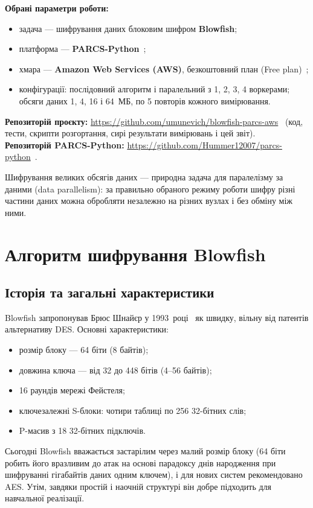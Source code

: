 \documentclass[a4paper,12pt]{article}
\begin{document}
\textbf{Обрані параметри роботи:}
\begin{itemize}
  \item задача --- шифрування даних блоковим шифром \textbf{Blowfish};
  \item платформа --- \textbf{PARCS-Python}~\cite{hummer-parcs};
  \item хмара --- \textbf{Amazon Web Services (AWS)}, безкоштовний план (Free plan)~\cite{aws-free-plan};
  \item конфігурації: послідовний алгоритм і паралельний з 1, 2, 3, 4 воркерами;
        обсяги даних 1, 4, 16 і 64~МБ, по 5 повторів кожного вимірювання.
\end{itemize}

\noindent\textbf{Репозиторій проєкту:} \url{https://github.com/umunevich/blowfish-parcs-aws}~\cite{project-repo}
(код, тести, скрипти розгортання, сирі результати вимірювань і цей звіт).\\
\textbf{Репозиторій PARCS-Python:} \url{https://github.com/Hummer12007/parcs-python}~\cite{hummer-parcs}.

Шифрування великих обсягів даних --- природна задача для паралелізму за даними
(data parallelism): за правильно обраного режиму роботи шифру різні частини
даних можна обробляти незалежно на різних вузлах і без обміну між ними.

\section{Алгоритм шифрування Blowfish}
\subsection{Історія та загальні характеристики}
Blowfish запропонував Брюс Шнайєр у 1993~році~\cite{schneier-blowfish} як швидку,
вільну від патентів альтернативу DES. Основні характеристики:
\begin{itemize}
  \item розмір блоку --- 64 біти (8 байтів);
  \item довжина ключа --- від 32 до 448 бітів (4--56 байтів);
  \item 16 раундів мережі Фейстеля;
  \item ключезалежні S-блоки: чотири таблиці по 256 32-бітних слів;
  \item P-масив з 18 32-бітних підключів.
\end{itemize}
Сьогодні Blowfish вважається застарілим через малий розмір блоку (64 біти робить
його вразливим до атак на основі парадоксу днів народження при шифруванні
гігабайтів даних одним ключем), і для нових систем рекомендовано AES. Утім,
завдяки простій і наочній структурі він добре підходить для навчальної реалізації.
\end{document}
